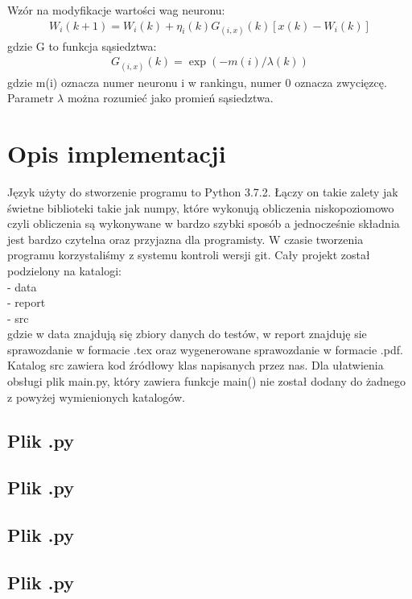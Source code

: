 \documentclass{classrep}
\begin{document}
{Wzór na modyfikacje wartości wag neuronu:
\begin{align*}
W_i(k+1)=W_i(k)+\eta_i(k)G_{(i,x)}(k)[x(k)-W_i(k)]
\end{align*}
gdzie G to funkcja sąsiedztwa:
\begin{align*}
G_{(i,x)}(k)=\exp(-m(i)/\lambda(k))
\end{align*}
gdzie m(i) oznacza numer neuronu i w rankingu, numer 0 oznacza zwycięzcę.\\
Parametr $\lambda$ można rozumieć jako promień sąsiedztwa.

}

\section{Opis implementacji}
{Język użyty do stworzenie programu to Python 3.7.2. Łączy on takie zalety jak świetne biblioteki takie jak numpy, które wykonują obliczenia niskopoziomowo czyli obliczenia są wykonywane w bardzo szybki sposób a jednocześnie składnia jest bardzo czytelna oraz przyjazna dla programisty. W czasie tworzenia programu korzystaliśmy z systemu kontroli wersji git. Cały projekt został podzielony na katalogi:\\
- data\\
- report\\
- src\\
gdzie w data znajdują się zbiory danych do testów, w report znajduję sie sprawozdanie w formacie .tex oraz wygenerowane sprawozdanie w formacie .pdf. Katalog src zawiera kod źródłowy klas napisanych przez nas. Dla ułatwienia obsługi plik main.py, który zawiera funkcje main() nie został dodany do żadnego z powyżej wymienionych katalogów.
	\subsection{Plik  .py}
	{

	}
	\subsection{Plik  .py}
	{

	}
	\subsection{Plik  .py}
	{

	}
	\subsection{Plik  .py}
	{

	}
}
\end{document}
